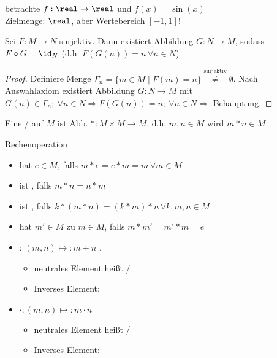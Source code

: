\begin{example}
	betrachte $f:\real\to\real$ und $f(x)=\sin(x)$ \\
	Zielmenge: $\real$, aber Wertebereich $[-1,1]$!
\end{example}

\begin{proposition}
	Sei $F:M\rightarrow N$ surjektiv. Dann existiert Abbildung $G:N\rightarrow M$, sodass $F\circ G = \id_N$ (d.h. $F(G(n)) = n\,\forall n\in N$)
\end{proposition}

\begin{proof}
	Definiere Menge $\Gamma_n = \{m \in M \mid F(m) = n\} \overset{\text{surjektiv}}{\neq} \emptyset$. Nach Auswahlaxiom 	existiert Abbildung $G: N \to M$ mit $G(n) \in \Gamma_n;\ \forall n \in N \Rightarrow F(G(n)) = n;\ \forall n \in N 	\Rightarrow$ Behauptung.
\end{proof}



\begin{*definition}[Verknüpfung]
	Eine  /  auf $M$ ist Abb. $*:M\times M\rightarrow M$, d.h. $m,n\in M$ wird  $m*n\in M$
	
	Rechenoperation
	\begin{itemize}
		\item hat  $e\in M$, falls $m*e = e*m = m\,\forall m\in M$
		\item ist , falls $m*n = n*m$
		\item ist , falls $k*(m*n) = (k*m)*n\,\forall k,m,n\in M$
		\item hat  $m'\in M$ zu $m\in M$, falls $m*m' = m'*m = e$
	\end{itemize}
\end{*definition}

\begin{example}
	\begin{itemize}
		\item {}: $(m,n)\mapsto: m+n$ ,
		\begin{itemize}
			\item neutrales Element heißt  / 
			\item Inverses Element: 
		\end{itemize}
		\item {} $\cdot:(m,n)\mapsto: m\cdot n$ 
		\begin{itemize}
			\item neutrales Element heißt  / 
			\item Inverses Element:
		\end{itemize}
	\end{itemize}
\end{example}

